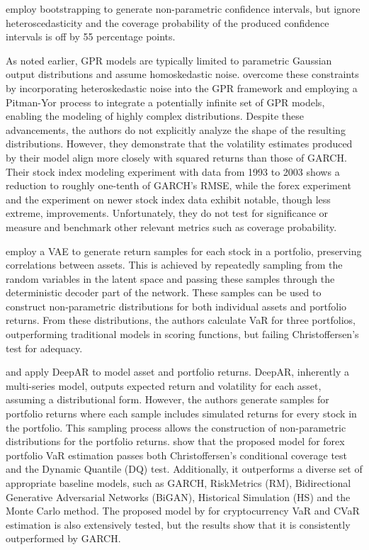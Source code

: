 \textcite{eriolu2020bootstrapped} employ bootstrapping to generate non-parametric confidence intervals, but ignore heteroscedasticity and the coverage probability of the produced confidence intervals is off by 55 percentage points.

As noted earlier, GPR models are typically limited to parametric Gaussian output distributions and assume homoskedastic noise. \textcite{Platanios2014gpr} overcome these constraints by incorporating heteroskedastic noise into the GPR framework and employing a Pitman-Yor process to integrate a potentially infinite set of GPR models, enabling the modeling of highly complex distributions. Despite these advancements, the authors do not explicitly analyze the shape of the resulting distributions. However, they demonstrate that the volatility estimates produced by their model align more closely with squared returns than those of GARCH. Their stock index modeling experiment with data from 1993 to 2003 shows a reduction to roughly one-tenth of GARCH's RMSE, while the forex experiment and the experiment on newer stock index data exhibit notable, though less extreme, improvements. Unfortunately, they do not test for significance or measure and benchmark other relevant metrics such as coverage probability.

\textcite{arian2022encoded} employ a VAE to generate return samples for each stock in a portfolio, preserving correlations between assets. This is achieved by repeatedly sampling from the random variables in the latent space and passing these samples through the deterministic decoder part of the network. These samples can be used to construct non-parametric distributions for both individual assets and portfolio returns. From these distributions, the authors calculate VaR for three portfolios, outperforming traditional models in scoring functions, but failing Christoffersen's test for adequacy.

\textcite{Fatouros2023DeepVaR} and \textcite{Almeida2024RiskForecasting} apply DeepAR to model asset and portfolio returns. DeepAR, inherently a multi-series model, outputs expected return and volatility for each asset, assuming a distributional form. However, the authors generate samples for portfolio returns where each sample includes simulated returns for every stock in the portfolio. This sampling process allows the construction of non-parametric distributions for the portfolio returns. \textcite{Fatouros2023DeepVaR} show that the proposed model for forex portfolio VaR estimation passes both Christoffersen's conditional coverage test and the Dynamic Quantile (DQ) test. Additionally, it outperforms a diverse set of appropriate baseline models, such as GARCH, RiskMetrics (RM), Bidirectional Generative
Adversarial Networks (BiGAN), Historical Simulation (HS) and the Monte Carlo method. The proposed model by \textcite{Almeida2024RiskForecasting} for cryptocurrency VaR and CVaR estimation is also extensively tested, but the results show that it is consistently outperformed by GARCH.

